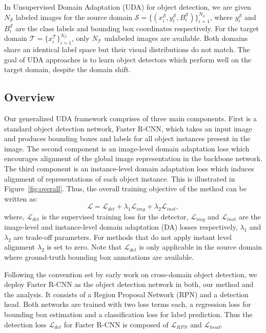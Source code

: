 \documentclass[10pt,twocolumn,letterpaper]{article}
\DeclareRobustCommand{\figref}[1]{Figure~\ref{#1}}
\begin{document}
 In Unsupervised Domain Adaptation (UDA) for object detection, we are given $N_\mathcal{S}$ labeled images for the source domain $\mathcal{S} = \{(x^\mathcal{S}_i, y^\mathcal{S}_i, B^\mathcal{S}_i)\}^{N_\mathcal{S}}_{i=1}$, where $y^\mathcal{S}_i$ and $B^\mathcal{S}_i$ are the class labels and bounding box coordinates respectively. For the target domain $\mathcal{T} = \{x^\mathcal{T}_i\}^{N_\mathcal{T}}_{i=1}$, only $N_\mathcal{T}$ unlabeled images are available.
Both domains share an identical label space but their visual distributions do not match. The goal of UDA approaches is to learn object detectors which perform well on the target domain, despite the domain shift.
\subsection{Overview} 
Our  generalized UDA framework comprises  of three main components.
First is a standard object detection network, Faster R-CNN, which takes an input image and produces bounding boxes and labels for all object instances present in the image. 
The second component is an image-level domain adaptation loss which encourages alignment of the global image representation in the backbone network.
The third component is an instance-level domain adaptation loss which induces alignment of representations of each object instance. 
This is illustrated in \figref{fig:overall}. 
Thus, the overall training objective of the method can be written as:
\begin{equation}
\mathcal{L} = \mathcal{L}_{det} + \lambda_1 \mathcal{L}_{img}+\lambda_2\mathcal{L}_{inst}, 
\label{eqn:final_loss}
\end{equation}
where, $\mathcal{L}_{det}$ is the supervised training loss for the detector, $\mathcal{L}_{img}$ and $\mathcal{L}_{inst}$ are the image-level and instance-level domain adaptation (DA) losses respectively, $\lambda_1$ and $\lambda_2$ are trade-off parameters. For methods that do not apply instant level alignment $\lambda_2$ is set to zero. Note that $\mathcal{L}_{det}$ is only applicable in the source domain where ground-truth bounding box annotations are available. 

 Following the convention set by early work on cross-domain object detection, we deploy Faster R-CNN \cite{da_faster_rcnn} as the object detection network in both, our method and the analysis. 
It consists of a Region Proposal Network (RPN) and a detection head. Both networks are trained with two loss terms each, a regression loss for bounding box estimation and a classification loss for label prediction. Thus the detection loss $\mathcal{L}_{det}$ for Faster R-CNN is composed of $\mathcal{L}_{RPN}$ and $\mathcal{L}_{head}$. 
\end{document}
